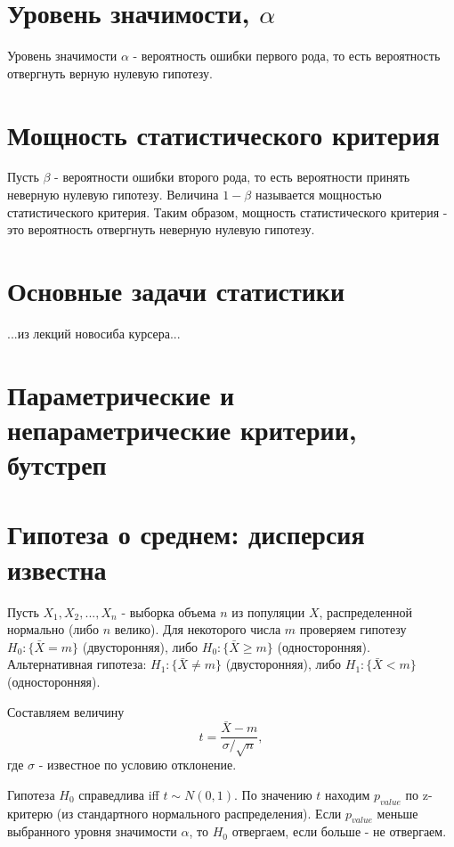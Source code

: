 \section{Уровень значимости, $\alpha$}

Уровень значимости $\alpha$ - вероятность ошибки первого рода, то есть вероятность отвергнуть верную нулевую гипотезу.


\section{Мощность статистического критерия}

Пусть $\beta$ - вероятности ошибки второго рода, то есть вероятности принять неверную нулевую гипотезу. Величина $1 - \beta$ называется мощностью статистического критерия. Таким образом, мощность статистического критерия - это вероятность отвергнуть неверную нулевую гипотезу.

\section{Основные задачи статистики}

...из лекций новосиба  курсера...


\section{Параметрические и непараметрические критерии, бутстреп}


\section{Гипотеза о среднем: дисперсия известна}

Пусть $X_1, X_2, ..., X_n$ - выборка объема $n$ из популяции $X$, распределенной нормально (либо $n$ велико).
Для некоторого числа $m$ проверяем гипотезу $H_0: \{ \bar{X} = m \}$ (двусторонняя), либо $H_0: \{ \bar{X} \geqslant m \}$ (односторонняя). 
Альтернативная гипотеза: $H_1: \{ \bar{X} \neq m \}$ (двусторонняя), либо $H_1: \{ \bar{X} < m \}$ (односторонняя). 

Составляем величину
$$
t = \frac{\bar{X} - m}{\sigma/\sqrt{n}},
$$
где $\sigma$ - известное по условию отклонение.

Гипотеза $H_0$ справедлива iff $t \sim N(0, 1)$. По значению $t$ находим $p_{value}$ по z-критерю (из стандартного нормального распределения). Если $p_{value}$ меньше выбранного уровня значимости $\alpha$, то $H_0$ отвергаем, если больше - не отвергаем.

